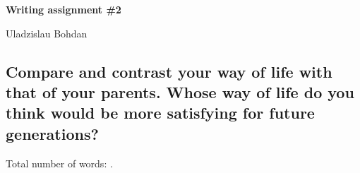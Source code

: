 \documentclass[12pt]{article}
\begin{document}
{\Large

\textbf{Writing assignment \#2}

Uladzislau Bohdan

}

\vspace{10mm}

\subsection*{Compare and contrast your way of life with that of your parents.
Whose way of life do you think would be more satisfying for future generations?}



\vspace{15mm}

Total number of words: .
\end{document}
